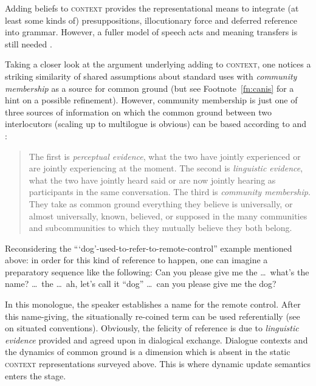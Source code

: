 \documentclass[output=paper]{langsci/langscibook}
\begin{document}
{Adding beliefs to \textsc{context} provides the representational means to integrate (at least some kinds of) presuppositions, illocutionary force and deferred reference \citep{Nunberg:1978} into grammar.
%
However, a fuller model of speech acts and meaning transfers is still needed \citep[]{Kathol:Przepiorkowski:Tseng:2011}. %


Taking a closer look at the argument underlying adding  to \textsc{context}, one notices a striking similarity of shared assumptions about standard uses with \emph{community membership}  as a source for common ground (but see Footnote~\ref{fn:canis} for a hint on a possible refinement).
%
However, community membership is just one of three sources of information on which the common ground between two interlocutors (scaling up to multilogue is obvious) can be based according to \citet{Clark:Marshall:1981} and \citet{Clark:Schreuder:Buttrick:1983}:
%
\begin{quote}
The first is \emph{perceptual evidence}, what the two have jointly experienced or are jointly experiencing at the moment. The second is \emph{linguistic evidence}, what the two have jointly heard said or are now jointly hearing as participants in the same conversation. The third is \emph{community membership}. They take as common ground everything they believe is universally, or almost universally, known, believed, or supposed in the many communities and subcommunities to which they mutually believe they both belong. \hfill \citep[]{Clark:Schreuder:Buttrick:1983} 
\end{quote}


Reconsidering the \enquote{\enquote{dog}-used-to-refer-to-remote-control} example mentioned above: in order for this kind of reference to happen, one can imagine a preparatory sequence like the following:
%
\ea
Can you please give me the \ldots\ what's the name? \ldots\ the \ldots\ ah, let's call it \enquote{dog} \ldots\ can you please give me the dog?
\z

In this monologue, the speaker establishes a name for the remote control.
%
After this name-giving, the situationally re-coined term can be used referentially (see \citet{Luecking:Rieser:Staudacher:2006:b} on situated conventions).
%
Obviously, the felicity of reference is due to \emph{linguistic evidence}  provided and agreed upon in dialogical exchange.
%
Dialogue contexts \citep{Lee-Goldman:2011} and the dynamics of common ground is a dimension which is absent in the static \textsc{context} representations surveyed above.
%
This is where dynamic update semantics enters the stage.




}
\end{document}
